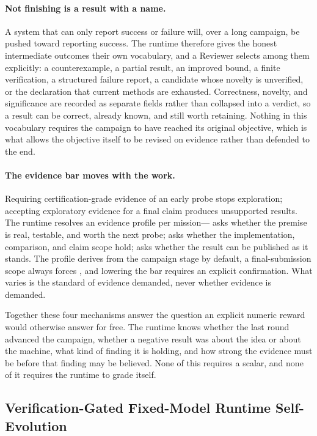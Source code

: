\paragraph{Not finishing is a result with a name.}
A system that can only report success or failure will, over a long campaign, be
pushed toward reporting success. The runtime therefore gives the honest intermediate
outcomes their own vocabulary, and a Reviewer selects among them explicitly: a
counterexample, a partial result, an improved bound, a finite verification, a
structured failure report, a candidate whose novelty is unverified, or the
declaration that current methods are exhausted. Correctness, novelty, and
significance are recorded as separate fields rather than collapsed into a verdict, so
a result can be correct, already known, and still worth retaining. Nothing in this
vocabulary requires the campaign to have reached its original objective, which is
what allows the objective itself to be revised on evidence rather than defended to
the end.

\paragraph{The evidence bar moves with the work.}
Requiring certification-grade evidence of an early probe stops exploration; accepting
exploratory evidence for a final claim produces unsupported results. The runtime
resolves an evidence profile per mission--- asks whether the premise is
real, testable, and worth the next probe;  asks whether the
implementation, comparison, and claim scope hold;  asks whether the
result can be published as it stands. The profile derives from the campaign stage by
default, a final-submission scope always forces , and lowering the bar
requires an explicit confirmation. What varies is the standard of evidence demanded,
never whether evidence is demanded.

Together these four mechanisms answer the question an explicit numeric reward would otherwise
answer for free. The runtime knows whether the last round advanced the campaign,
whether a negative result was about the idea or about the machine, what kind of
finding it is holding, and how strong the evidence must be before that finding may be
believed. None of this requires a scalar, and none of it requires the runtime to
grade itself.

\subsection{Verification-Gated Fixed-Model Runtime Self-Evolution}

